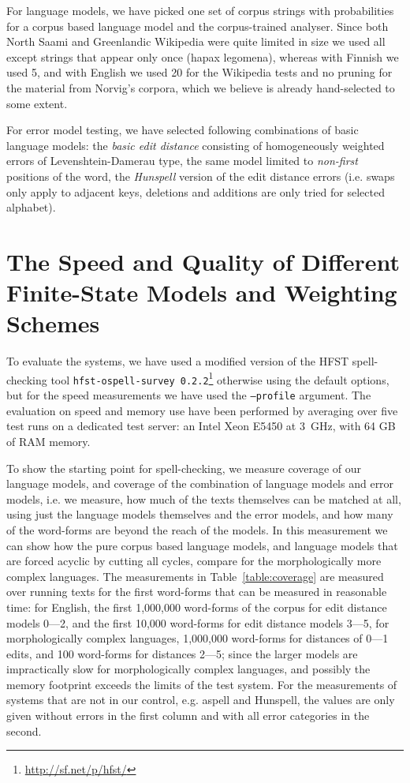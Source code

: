 \documentclass[a4paper,12pt]{article}
\begin{document}
For language models, we have picked one set of corpus strings with
probabilities for a corpus based language model and the corpus-trained
analyser. Since both North Saami and Greenlandic Wikipedia were quite limited in
size we used all except strings that appear only once (hapax legomena), whereas
with Finnish we used 5, and with English we used 20 for the Wikipedia
tests and no pruning for the material from Norvig's corpora, which we believe
is already hand-selected to some extent.

For error model testing, we have selected following combinations of basic
language models: the \emph{basic edit distance} consisting of homogeneously
weighted errors of Levenshtein-Damerau type, the same model limited to
\emph{non-first} positions of the word, the \emph{Hunspell} version of the edit
distance errors (i.e. swaps only apply to adjacent keys, deletions and
additions are only tried for selected alphabet).


\section{The Speed and Quality of Different Finite-State Models and Weighting
Schemes}
\label{sec:evaluation}

To evaluate the systems, we have used a modified version of the HFST
spell-checking tool \texttt{hfst-ospell-survey
0.2.2}\footnote{\url{http://sf.net/p/hfst/}} otherwise using the default
options, but for the speed measurements we have used the \texttt{--profile}
argument.  The evaluation on speed and memory use have been performed by
averaging over five test runs on a dedicated test server: an Intel
Xeon E5450 at 3~GHz, with 64 GB of RAM memory.

To show the starting point for spell-checking, we measure coverage of our
language models, and coverage of the combination of language models and error
models, i.e. we measure, how much of the texts themselves can be matched at
all, using just the language models themselves and the error models, and how
many of the word-forms are beyond the reach of the models. In this measurement
we can show how the pure corpus based language models, and language models that
are forced acyclic by cutting all cycles, compare for the morphologically more
complex languages.  The measurements in Table~\ref{table:coverage} are measured
over running texts for the first word-forms that can be measured in reasonable
time: for English, the first 1,000,000 word-forms of the corpus for edit
distance models 0---2, and the first 10,000 word-forms for edit distance models
3---5, for morphologically complex languages, 1,000,000 word-forms for
distances of 0---1 edits, and 100 word-forms for distances 2---5; since the
larger models are impractically slow for morphologically complex languages, and
possibly the memory footprint exceeds the limits of the test system. For the
measurements of systems that are not in our control, e.g. aspell and Hunspell,
the values are only given without errors in the first column and with all
error categories in the second.
\end{document}
